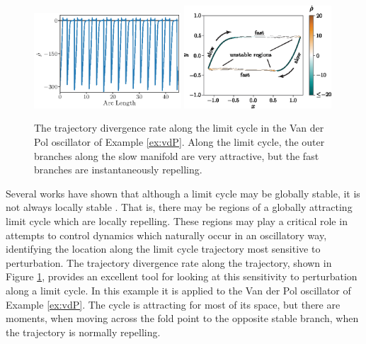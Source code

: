 \documentclass[twocolumn]{svjour3}
\begin{document}
\begin{figure}
\centering
\includegraphics[width=0.49\textwidth]{Figures/repulsion-values.eps}
\includegraphics[width=0.49\textwidth]{Figures/limit-cycle_RepRate-update.eps}
\caption{The trajectory divergence rate along the limit cycle in the Van der Pol oscillator of Example \ref{ex:vdP}. Along the limit cycle, the outer branches along the slow manifold are very attractive, but the fast branches are instantaneously repelling.}
\label{fig:limitcycle}
\end{figure}

Several works have shown that although a limit cycle may be globally stable, it is not always locally stable \cite{ali1999local,norris2008revisiting}. That is, there may be regions of a globally attracting limit cycle which are locally repelling. These regions may play a critical role in attempts to control dynamics which naturally occur in an oscillatory way, identifying the location along the limit cycle trajectory most sensitive to perturbation. The trajectory divergence rate along the trajectory, shown in Figure \ref{fig:limitcycle}, provides an excellent tool for looking at this sensitivity to perturbation along a limit cycle. In this example it is applied to the Van der Pol oscillator of Example \ref{ex:vdP}. The cycle is attracting for most of its space, but there are moments, when moving across the fold point to the opposite stable branch, when the trajectory is normally repelling.
\end{document}
